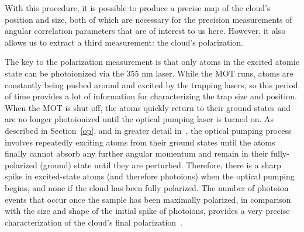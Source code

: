 

With this procedure, it is possible to produce a precise map of the cloud's position and size, both of which are necessary for the precision measurements of angular correlation parameters that are of interest to us here.  However, it also allows us to extract a third measurement:  the cloud's polarization.

The key to the polarization measurement is that only atoms in the excited atomic state can be photoionized via the 355 nm laser.  While the MOT runs, atoms are constantly being pushed around and excited by the trapping lasers, so this period of time provides a lot of information for characterizing the trap size and position.  When the MOT is shut off, the atoms quickly return to their ground states and are no longer photoionized until the optical pumping laser is turned on.  As described in Section~\ref{op}, and in greater detail in~\cite{ben_OP}, the optical pumping process involves repeatedly exciting atoms from their ground states until the atoms finally cannot absorb any further angular momentum and remain in their fully-polarized (ground) state until they are perturbed.  Therefore, there is a sharp spike in excited-state atoms (and therefore photoions) when the optical pumping begins, and none if %
the cloud has been fully polarized.  The number of photoion events that occur once the sample has been maximally polarized, in comparison with the size and shape of the initial spike of photoions, provides a very precise characterization of the cloud's final polarization~\cite{ben_OP}.





